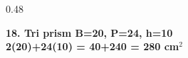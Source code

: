 \documentclass[aspectratio=169,12pt]{beamer}
\begin{document}
\begin{frame}[t]
\begin{columns}[T,onlytextwidth]
\begin{column}{0.48\textwidth}\begin{AnsCard}\small\textcolor{mmgreenDeep}{\textbf{18. Tri prism B=20, P=24, h=10}}\\\vspace{0.1em}\textcolor{mmanswerColor}{\textbf{2(20)+24(10) = 40+240 = 280 cm$^2$}}\end{AnsCard}\end{column}
\end{columns}
\end{frame}
\end{document}
